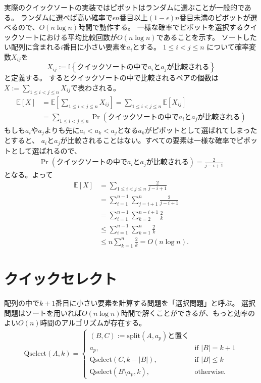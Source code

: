 \documentclass[a4paper,twoside,onecolumn,openany,article,10pt]{memoir}
\theoremstyle{remark}
\begin{document}
実際のクイックソートの実装ではピボットはランダムに選ぶことが一般的である。
ランダムに選べば高い確率で$\epsilon n$番目以上$(1-\epsilon) n$番目未満のピボットが選べるので、$O(n\log n)$時間で動作する。
一様な確率でピボットを選択するクイックソートにおける平均比較回数が$O(n\log n)$であることを示す。
ソートしたい配列に含まれる$i$番目に小さい要素を$a_i$とする。
$1\le i<j\le n$ について確率変数$X_{ij}$を
\begin{equation*}
X_{ij} := \mathbb{I}\left\{\text{クイックソートの中で$a_i$と$a_j$が比較される}\right\}
\end{equation*}
と定義する。
するとクイックソートの中で比較されるペアの個数は$X:=\sum_{1\le i<j\le n} X_{ij}$で表わされる。
\begin{align*}
\mathbb{E}[X] &=
\mathbb{E}\left[\sum_{1\le i<j\le n} X_{ij}\right]
=
\sum_{1\le i<j\le n} \mathbb{E}[X_{ij}]\\
&=
\sum_{1\le i<j\le n} \Pr\left(\text{クイックソートの中で$a_i$と$a_j$が比較される}\right)
\end{align*}
もしも$a_i$や$a_j$よりも先に$a_i < a_k < a_j$となる$a_k$がピボットとして選ばれてしまったとすると、
$a_i$と$a_j$が比較されることはない。すべての要素は一様な確率でピボットとして選ばれるので、
\begin{align*}
\Pr\left(\text{クイックソートの中で$a_i$と$a_j$が比較される}\right) = \frac2{j-i+1}
\end{align*}
となる。よって
\begin{align*}
\mathbb{E}[X] &=
\sum_{1\le i<j\le n} \frac2{j-i+1}\\
&= \sum_{i=1}^{n-1} \sum_{j=i+1}^n \frac2{j-i+1}\\
&= \sum_{i=1}^{n-1} \sum_{k=2}^{n-i+1} \frac2{k}\\
&\le \sum_{i=1}^{n-1} \sum_{k=1}^{n} \frac2{k}\\
&\le n\sum_{k=1}^{n} \frac2{k} = O(n\log n).
\end{align*}

\section{クイックセレクト}
配列の中で$k+1$番目に小さい要素を計算する問題を「選択問題」と呼ぶ。
選択問題はソートを用いれば$O(n\log n)$時間で解くことができるが、もっと効率のよい$O(n)$時間のアルゴリズムが存在する。
\begin{align*}
\mathrm{Qselect}(A, k) =
\begin{cases}
(B, C) := \mathrm{split}(A, a_p)\text{と置く}\\
a_p,& \text{if } |B| = k+1\\
\mathrm{Qselect}(C, k-|B|),&\text{if } |B| \le k\\
\mathrm{Qselect}(B\setminus a_p, k),&\text{otherwise.}
\end{cases}
\end{align*}
\end{document}
